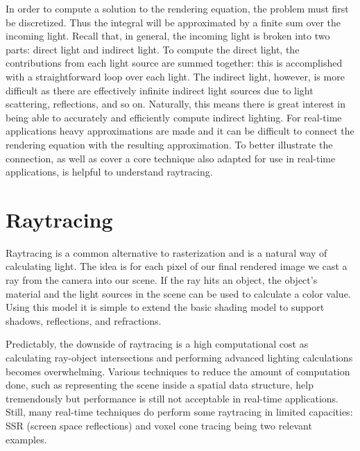 In order to compute a solution to the rendering equation, the problem must first be discretized. Thus the integral will be approximated by a finite sum over the incoming light. Recall that, in general, the incoming light is broken into two parts: direct light and indirect light. To compute the direct light, the contributions from each light source are summed together: this is accomplished with a straightforward loop over each light. The indirect light, however, is more difficult as there are effectively infinite indirect light sources due to light scattering, reflections, and so on. Naturally, this means there is great interest in being able to accurately and efficiently compute indirect lighting. For real-time applications heavy approximations are made and it can be difficult to connect the rendering equation with the resulting approximation. To better illustrate the connection, as well as cover a core technique also adapted for use in real-time applications, is helpful to understand raytracing.


\section{Raytracing}
Raytracing is a common alternative to rasterization and is a natural way of calculating light. The idea is for each pixel of our final rendered image we cast a ray from the camera into our scene. If the ray hits an object, the object's material and the light sources in the scene can be used to calculate a color value. Using this model it is simple to extend the basic shading model to support shadows, reflections, and refractions.

Predictably, the downside of raytracing is a high computational cost as calculating ray-object intersections and performing advanced lighting calculations becomes overwhelming. Various techniques to reduce the amount of computation done, such as representing the scene inside a spatial data structure, help tremendously but performance is still not acceptable in real-time applications. Still, many real-time techniques do perform some raytracing in limited capacities: SSR (screen space reflections) and voxel cone tracing being two relevant examples.

